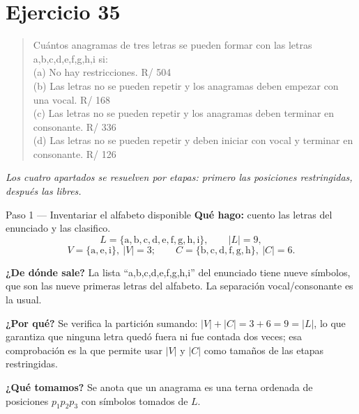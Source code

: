 \documentclass[11pt]{article}
\begin{document}
\section*{Ejercicio 35}

\begin{quote}
Cuántos anagramas de tres letras se pueden formar con las letras a,b,c,d,e,f,g,h,i si:\\[2pt]
(a) No hay restricciones. \hfill R/ 504\\
(b) Las letras no se pueden repetir y los anagramas deben empezar con una vocal. \hfill R/ 168\\
(c) Las letras no se pueden repetir y los anagramas deben terminar en consonante. \hfill R/ 336\\
(d) Las letras no se pueden repetir y deben iniciar con vocal y terminar en consonante. \hfill R/ 126
\end{quote}

\emph{Los cuatro apartados se resuelven por etapas: primero las posiciones restringidas, después las libres.}

\begin{paso}{Paso 1 --- Inventariar el alfabeto disponible}
\textbf{Qué hago:} cuento las letras del enunciado y las clasifico.
\[
  L=\{\text{a},\text{b},\text{c},\text{d},\text{e},\text{f},\text{g},\text{h},\text{i}\},\qquad |L|=9 ,
\]
\[
  V=\{\text{a},\text{e},\text{i}\},\ |V|=3 ;\qquad C=\{\text{b},\text{c},\text{d},\text{f},\text{g},\text{h}\},\ |C|=6 .
\]

\textbf{¿De dónde sale?} La lista ``a,b,c,d,e,f,g,h,i'' del enunciado tiene nueve símbolos, que son las nueve primeras letras del alfabeto. La separación vocal/consonante es la usual.

\textbf{¿Por qué?} Se verifica la partición sumando: $|V|+|C|=3+6=9=|L|$, lo que garantiza que ninguna letra quedó fuera ni fue contada dos veces; esa comprobación es la que permite usar $|V|$ y $|C|$ como tamaños de las etapas restringidas.

\textbf{¿Qué tomamos?} Se anota que un anagrama es una terna ordenada de posiciones $p_1p_2p_3$ con símbolos tomados de $L$.
\end{paso}
\end{document}

